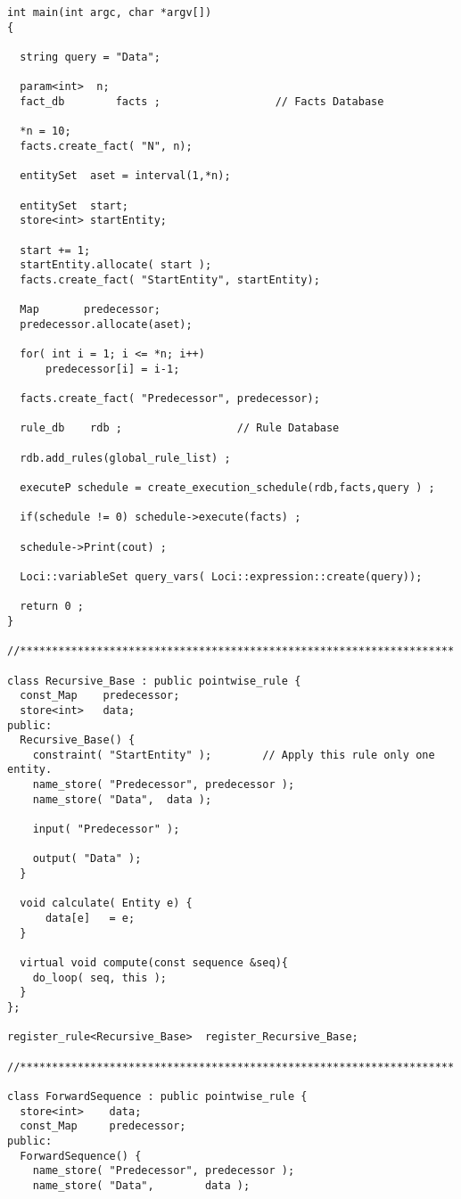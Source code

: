 \begin{verbatim}
int main(int argc, char *argv[]) 
{
  
  string query = "Data";

  param<int>  n;
  fact_db        facts ;	              // Facts Database
  
  *n = 10;
  facts.create_fact( "N", n);

  entitySet  aset = interval(1,*n);

  entitySet  start;
  store<int> startEntity;

  start += 1;
  startEntity.allocate( start );
  facts.create_fact( "StartEntity", startEntity);

  Map       predecessor;
  predecessor.allocate(aset);

  for( int i = 1; i <= *n; i++)
      predecessor[i] = i-1;

  facts.create_fact( "Predecessor", predecessor);

  rule_db    rdb ;                  // Rule Database
  
  rdb.add_rules(global_rule_list) ;

  executeP schedule = create_execution_schedule(rdb,facts,query ) ;

  if(schedule != 0) schedule->execute(facts) ;

  schedule->Print(cout) ;
  
  Loci::variableSet query_vars( Loci::expression::create(query));

  return 0 ;
}

//********************************************************************

class Recursive_Base : public pointwise_rule {
  const_Map    predecessor;
  store<int>   data;
public:
  Recursive_Base() {
    constraint( "StartEntity" );        // Apply this rule only one entity.
    name_store( "Predecessor", predecessor );
    name_store( "Data",  data );

    input( "Predecessor" );

    output( "Data" );
  }

  void calculate( Entity e) {
      data[e]   = e;
  }

  virtual void compute(const sequence &seq){
    do_loop( seq, this );
  }
};

register_rule<Recursive_Base>  register_Recursive_Base;

//********************************************************************

class ForwardSequence : public pointwise_rule {
  store<int>    data;
  const_Map     predecessor;
public:
  ForwardSequence() {
    name_store( "Predecessor", predecessor );
    name_store( "Data",        data );


\end{verbatim}
